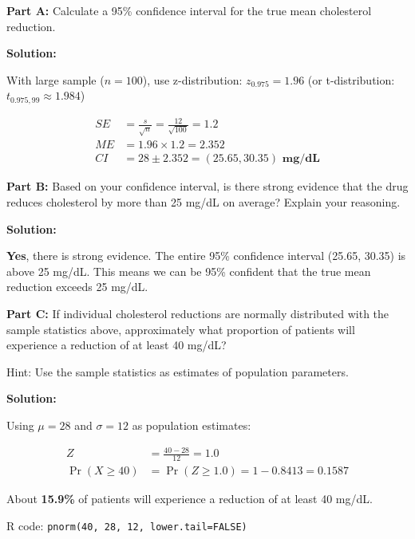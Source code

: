 \documentclass[11pt]{article}
\begin{document}
\textbf{Part A:} Calculate a 95\% confidence interval for the true mean cholesterol reduction.

\textcolor{correctgreen}{\textbf{Solution:}}

With large sample ($n=100$), use z-distribution: $z_{0.975} = 1.96$ (or t-distribution: $t_{0.975,99} \approx 1.984$)

\begin{align*}
SE &= \frac{s}{\sqrt{n}} = \frac{12}{\sqrt{100}} = 1.2\\
ME &= 1.96 \times 1.2 = 2.352\\
CI &= 28 \pm 2.352 = \mathbf{(25.65, 30.35) \text{ mg/dL}}
\end{align*}

\vspace{0.5cm}

\textbf{Part B:} Based on your confidence interval, is there strong evidence that the drug reduces cholesterol by more than 25 mg/dL on average? Explain your reasoning.

\textcolor{correctgreen}{\textbf{Solution:}}

\textbf{Yes}, there is strong evidence. The entire 95\% confidence interval (25.65, 30.35) is above 25 mg/dL. This means we can be 95\% confident that the true mean reduction exceeds 25 mg/dL.

\vspace{0.5cm}

\textbf{Part C:} If individual cholesterol reductions are normally distributed with the sample statistics above, approximately what proportion of patients will experience a reduction of at least 40 mg/dL?

Hint: Use the sample statistics as estimates of population parameters.

\textcolor{correctgreen}{\textbf{Solution:}}

Using $\mu = 28$ and $\sigma = 12$ as population estimates:

\begin{align*}
Z &= \frac{40 - 28}{12} = 1.0\\
\Pr(X \geq 40) &= \Pr(Z \geq 1.0) = 1 - 0.8413 = \mathbf{0.1587}
\end{align*}

About \textbf{15.9\%} of patients will experience a reduction of at least 40 mg/dL.

R code: \texttt{pnorm(40, 28, 12, lower.tail=FALSE)}

\vspace{0.5cm}
\end{document}
